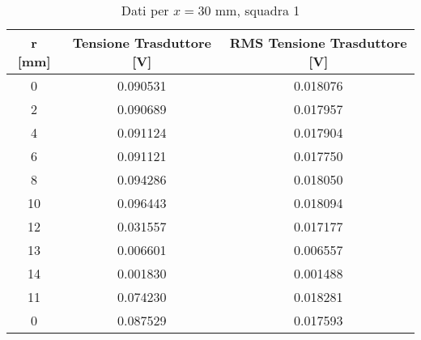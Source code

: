 \begin{table}[h]
\centering
\begin{tabular}{|c|c|c|}
\hline
r {[}mm{]} & Tensione Trasduttore {[}V{]} & RMS Tensione Trasduttore {[}V{]} \\ \hline
0          & 0.090531                     & 0.018076                         \\ \hline
2          & 0.090689                     & 0.017957                         \\ \hline
4          & 0.091124                     & 0.017904                         \\ \hline
6          & 0.091121                     & 0.017750                         \\ \hline
8          & 0.094286                     & 0.018050                         \\ \hline
10         & 0.096443                     & 0.018094                         \\ \hline
12         & 0.031557                     & 0.017177                         \\ \hline
13         & 0.006601                     & 0.006557                         \\ \hline
14         & 0.001830                     & 0.001488                         \\ \hline
11         & 0.074230                     & 0.018281                         \\ \hline
0          & 0.087529                     & 0.017593                         \\ \hline
\end{tabular}
\caption{Dati per $x=30$ mm, squadra 1}
\end{table}
\clearpage
